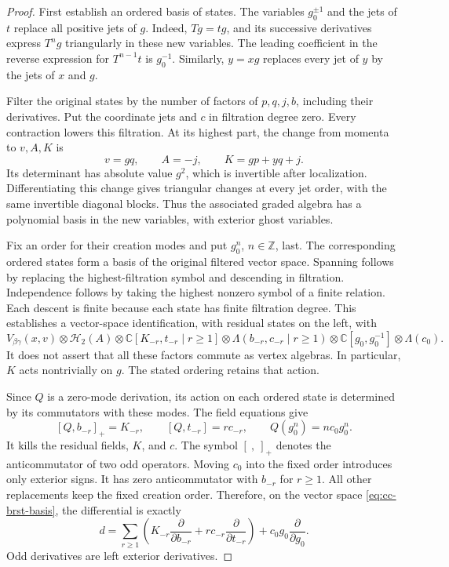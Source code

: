 \begin{proof}
First establish an ordered basis of states.
The variables $g_0^{\pm1}$ and the jets of $t$ replace all positive jets of $g$.
Indeed, $Tg=tg$, and its successive derivatives express $T^ng$ triangularly in these new variables.
The leading coefficient in the reverse expression for $T^{n-1}t$ is $g_0^{-1}$.
Similarly, $y=xg$ replaces every jet of $y$ by the jets of $x$ and $g$.

Filter the original states by the number of factors of $p,q,j,b$, including their derivatives.
Put the coordinate jets and $c$ in filtration degree zero.
Every contraction lowers this filtration.
At its highest part, the change from momenta to $v,A,K$ is
\[
 v=gq,\qquad A=-j,\qquad K=gp+yq+j.
\]
Its determinant has absolute value $g^2$, which is invertible after localization.
Differentiating this change gives triangular changes at every jet order, with the same invertible diagonal blocks.
Thus the associated graded algebra has a polynomial basis in the new variables, with exterior ghost variables.

Fix an order for their creation modes and put $g_0^n$, $n\in\mathbb Z$, last.
The corresponding ordered states form a basis of the original filtered vector space.
Spanning follows by replacing the highest-filtration symbol and descending in filtration.
Independence follows by taking the highest nonzero symbol of a finite relation.
Each descent is finite because each state has finite filtration degree.
This establishes a vector-space identification, with residual states on the left, with
\begin{equation}\label{eq:cc-brst-basis}
 V_{\beta\gamma}(x,v)\otimes\mathcal H_2(A)
 \otimes\mathbb C[K_{-r},t_{-r}\mid r\geq1]
 \otimes\Lambda(b_{-r},c_{-r}\mid r\geq1)
 \otimes\mathbb C[g_0,g_0^{-1}]\otimes\Lambda(c_0).
\end{equation}
It does not assert that all these factors commute as vertex algebras.
In particular, $K$ acts nontrivially on $g$.
The stated ordering retains that action.

Since $Q$ is a zero-mode derivation, its action on each ordered state is determined by its commutators with these modes.
The field equations give
\[
 [Q,b_{-r}]_+=K_{-r},\qquad
 [Q,t_{-r}]=r c_{-r},\qquad Q(g_0^n)=n c_0g_0^n.
\]
It kills the residual fields, $K$, and $c$.
The symbol $[\ ,\ ]_+$ denotes the anticommutator of two odd operators.
Moving $c_0$ into the fixed order introduces only exterior signs.
It has zero anticommutator with $b_{-r}$ for $r\geq1$.
All other replacements keep the fixed creation order.
Therefore, on the vector space \eqref{eq:cc-brst-basis}, the differential is exactly
\begin{equation}\label{eq:cc-brst-polynomial-differential}
 d=\sum_{r\geq1}\left(
 K_{-r}\frac{\partial}{\partial b_{-r}}
 +r c_{-r}\frac{\partial}{\partial t_{-r}}\right)
 +c_0g_0\frac{\partial}{\partial g_0}.
\end{equation}
Odd derivatives are left exterior derivatives.


\end{proof}
